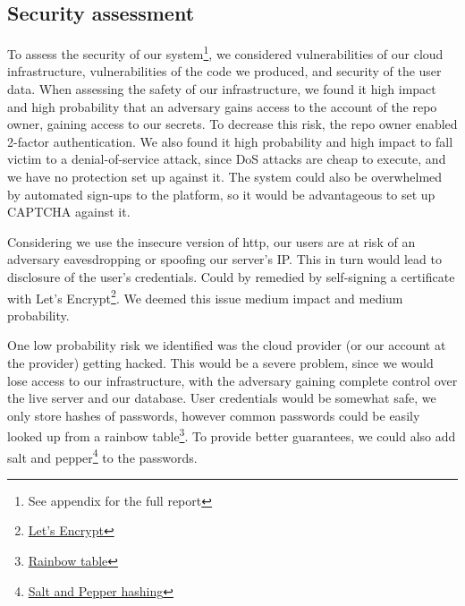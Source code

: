 \documentclass[report/main.tex]{subfiles}
\begin{document}

        \subsection{Security assessment}
            To assess the security of our system\footnote{See appendix for the full report}, we considered vulnerabilities of our cloud infrastructure, vulnerabilities of the code we produced, and security of the user data.
            When assessing the safety of our infrastructure, we found it high impact and high probability that an adversary gains access to the account of the repo owner, gaining access to our secrets. To decrease this risk, the repo owner enabled 2-factor authentication. We also found it high probability and high impact to fall victim to a denial-of-service attack, since DoS attacks are cheap to execute, and we have no protection set up against it. The system could also be overwhelmed by automated sign-ups to the platform, so it would be advantageous to set up CAPTCHA against it.
        
            Considering we use the insecure version of http, our users are at risk of an adversary eavesdropping or spoofing our server's IP. This in turn would lead to disclosure of the user's credentials. Could by remedied by self-signing a certificate with Let's Encrypt\footnote{\href{https://letsencrypt.org/}{Let's Encrypt}}. We deemed this issue medium impact and medium probability.
        
            One low probability risk we identified was the cloud provider (or our account at the provider) getting hacked. This would be a severe problem, since we would lose access to our infrastructure, with the adversary gaining complete control over the live server and our database. User credentials would be somewhat safe, we only store hashes of passwords, however common passwords could be easily looked up from a rainbow table\footnote{\href{https://lasec.epfl.ch/pub/lasec/doc/Oech03.pdf}{Rainbow table}}. To provide better guarantees, we could also add salt and pepper\footnote{\href{https://medium.com/@berto168/salt-pepper-spice-up-your-hash-b48328caa2af}{Salt and Pepper hashing}} to the passwords.
            
\end{document}
